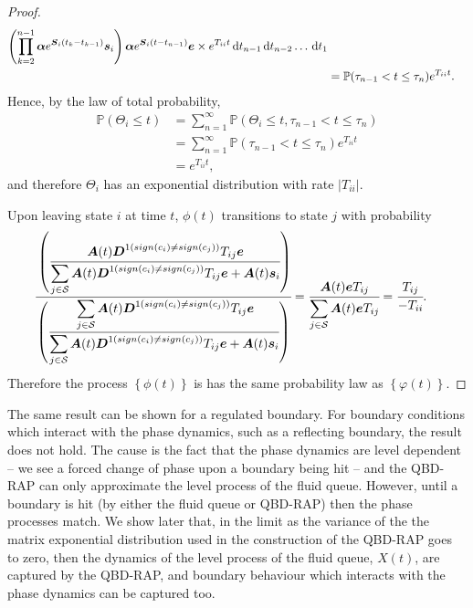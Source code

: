 \begin{proof}
\begin{align*}
			\left(\prod_{k=2}^{n-1} \boldsymbol \alpha e^{\boldsymbol{S}_i(t_k-t_{k-1})} \boldsymbol s_i\right) \boldsymbol \alpha e^{\boldsymbol{S}_i(t-t_{n-1})}\boldsymbol e
			\times e^{T_{ii}t} \, \mathrm{d} t_{n-1}\, \mathrm{d} t_{n-2}\hdots\, \mathrm{d} t_{1}
		\\&= \mathbb P(\tau_{n-1}< t \leq \tau_n)\displaystyle{  e^{T_{ii}t} }.
	\end{align*}
	Hence, by the law of total probability, 
	\begin{align*}
		\mathbb P(\Theta_i\leq t) &= \sum_{n=1}^\infty \mathbb P(\Theta_i\leq t, \tau_{n-1} < t \leq \tau_n)
		\\&= \sum_{n=1}^\infty \mathbb P(\tau_{n-1} < t \leq \tau_n)\displaystyle{  e^{T_{ii}t} }
		\\&= e^{T_{ii}t},
	\end{align*}
	and therefore \(\Theta_i\) has an exponential distribution with rate \(|T_{ii}|\). 
	
	Upon leaving state \(i\) at time \(t\), \({\phi}(t)\) transitions to state \(j\) with probability 
	\begin{align*}
            	\cfrac{\left(\cfrac{\boldsymbol A(t) \boldsymbol{D}^{1(sign(c_i)\neq sign(c_j))}T_{ij}\boldsymbol e}{\displaystyle\sum_{j\in\mathcal S}\boldsymbol A(t) \boldsymbol{D}^{1(sign(c_i)\neq sign(c_j))}T_{ij}\boldsymbol e + \boldsymbol A(t) \boldsymbol s_i}\right)}
            	{\left(\cfrac{\displaystyle\sum_{j\in\mathcal S}\boldsymbol A(t) \boldsymbol{D}^{1(sign(c_i)\neq sign(c_j))}T_{ij}\boldsymbol e}{\displaystyle\sum_{j\in\mathcal S}\boldsymbol A(t) \boldsymbol{D}^{1(sign(c_i)\neq sign(c_j))}T_{ij}\boldsymbol e + \boldsymbol A(t) \boldsymbol s_i}\right)}
            	&=\cfrac{\boldsymbol A(t) \boldsymbol eT_{ij}}
            	{\displaystyle\sum_{j\in\mathcal S}\boldsymbol A(t) \boldsymbol eT_{ij}}
	= \cfrac{T_{ij}}
            	{-T_{ii}}.
	 \end{align*}
	 Therefore the process \(\left\{{\phi}(t)\right\}\) is has the same probability law as \(\left\{\varphi(t)\right\}\).
\end{proof}
\begin{rem}
The same result can be shown for a regulated boundary. For boundary conditions which interact with the phase dynamics, such as a reflecting boundary, the result does not hold. The cause is the fact that the phase dynamics are level dependent -- we see a forced change of phase upon a boundary being hit -- and the QBD-RAP can only approximate the level process of the fluid queue. However, until a boundary is hit (by either the fluid queue or QBD-RAP) then the phase processes match. We show later that, in the limit as the variance of the the matrix exponential distribution used in the construction of the QBD-RAP goes to zero, then the dynamics of the level process of the fluid queue, \(X(t)\), are captured by the QBD-RAP, and boundary behaviour which interacts with the phase dynamics can be captured too.
\end{rem}

